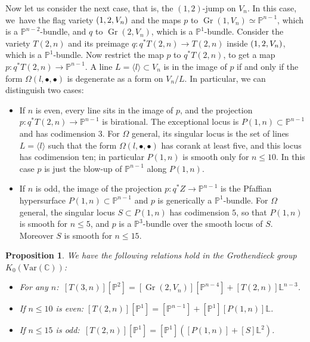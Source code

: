 \documentclass[JEP,XML,SOM,Unicode,NoEqCountersInSection]{cedram}
\newcommand{\NoChangel}[1]{%
\expandafter\let\csname old\string#1\endcsname=#1
\let#1=\relax
\newcommand{#1}{\mathcode`l="716C\csname old\string#1\endcsname\mathcode`l="7160 }%
}
\newcommand{\sbullet}{{\scriptstyle\bullet}}
\newcommand{\Var}{\mathrm{Var}}
\theoremstyle{plain}
\newtheorem{prop}[theorem]{Proposition}
\theoremstyle{definition}
\newcommand{\sod}[1]{\langle #1 \rangle}
\DeclareMathOperator{\Gr}{Gr}
\DeclareMathOperator{\Fl}{Fl}\NoChangel{\Fl}
\newcommand{\CC}{\mathbb{C}}
\newcommand{\LL}{\mathbb{L}}
\newcommand{\PP}{\mathbb{P}}
\begin{document}
Now let us consider the next case, that is, the $(1,2)$-jump on $V_n$. In this case, we~have the flag variety $\Fl(1,2,V_n)$ and the maps $p$ to $\Gr(1,V_n)\simeq \PP^{n-1}$, which is a $\PP^{n-2}$-bundle, and $q$ to $\Gr(2,V_n)$, which is a $\PP^1$-bundle. Consider the variety $T(2,n)$ and its preimage $q: q^*T(2,n) \to T(2,n)$ inside $\Fl(1,2,V_n)$, which is a $\PP^1$-bundle. Now restrict the map $p$ to $q^*T(2,n)$, to get a map $p: q^*T(2,n) \to \PP^{n-1}$. A line $L = \sod{l} \subset V_n$ is in the image of $p$ if and only if the form $\Omega(l,\sbullet,\sbullet)$ is degenerate as a form on $V_n/L$. In particular, we can distinguish two cases:

\begin{itemize}
\item If $n$ is even, every line sits in the image of $p$, and the projection $p: q^*T(2,n) \to \PP^{n-1}$ is birational. The exceptional locus is $P(1,n) \subset \PP^{n-1}$ and has codimension $3$. For $\Omega$ general, its singular locus is the set of lines $L = \sod{l}$ such that
the form $\Omega(l,\sbullet,\sbullet)$ has corank at least five, and this locus has codimension ten; in particular $P(1,n)$ is smooth only for $n\le 10$. In this case $p$ is just the blow-up of $\PP^{n-1}$ along $P(1,n)$.
\item If $n$ is odd, the image of the projection $p: q^*Z \to \PP^{n-1}$ is the Pfaffian
hypersurface $P(1,n) \subset \PP^{n-1}$ and $p$ is generically a $\PP^1$-bundle.
For $\Omega$ general, the singular locus $S \subset P(1,n)$ has codimension $5$, so
that $P(1,n)$ is smooth for $n \leq 5$, and $p$ is a $\PP^3$-bundle over the smooth
locus of $S$. Moreover $S$ is smooth for $n\le 15$.
\end{itemize}

\begin{prop}\label{prop:jump-T2-to-T3}
We have the following relations hold in the Grothendieck group $K_0(\Var(\CC))$:\vspace*{-3pt}
\begin{itemize}
\item For any $n$:\qquad\quad\;\,
$[T(3,n)][\PP^2]=[\Gr(2,V_n)][\PP^{n-4}]+[T(2,n)]\LL^{n-3}$.

\item If $n\le 10$ is even:\quad
$[T(2,n)][\PP^1]=[\PP^{n-1}]+[\PP^1][P(1,n)]\LL$.

\item If $n\le 15$ is odd:\quad\,
$[T(2,n)][\PP^1]=[\PP^1]([P(1,n)]+[S]\LL^2)$.
\end{itemize}
\end{prop}
\end{document}
